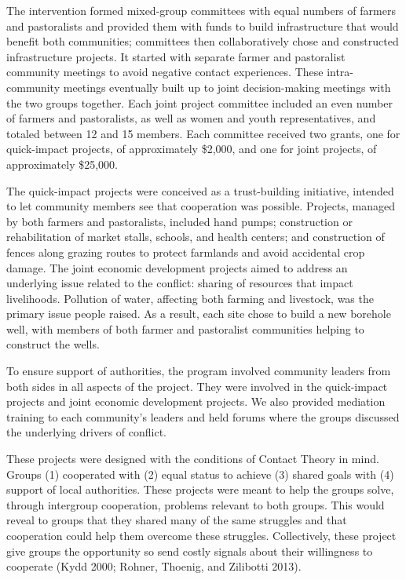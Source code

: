 \documentclass[11pt]{article}
\begin{document}
The intervention formed mixed-group committees with equal numbers of
farmers and pastoralists and provided them with funds to build
infrastructure that would benefit both communities; committees then
collaboratively chose and constructed infrastructure projects. It
started with separate farmer and pastoralist community meetings to avoid
negative contact experiences. These intra-community meetings eventually
built up to joint decision-making meetings with the two groups together.
Each joint project committee included an even number of farmers and
pastoralists, as well as women and youth representatives, and totaled
between 12 and 15 members. Each committee received two grants, one for
quick-impact projects, of approximately \$2,000, and one for joint
projects, of approximately \$25,000.

The quick-impact projects were conceived as a trust-building initiative,
intended to let community members see that cooperation was possible.
Projects, managed by both farmers and pastoralists, included hand pumps;
construction or rehabilitation of market stalls, schools, and health
centers; and construction of fences along grazing routes to protect
farmlands and avoid accidental crop damage. The joint economic
development projects aimed to address an underlying issue related to the
conflict: sharing of resources that impact livelihoods. Pollution of
water, affecting both farming and livestock, was the primary issue
people raised. As a result, each site chose to build a new borehole
well, with members of both farmer and pastoralist communities helping to
construct the wells.

To ensure support of authorities, the program involved community leaders
from both sides in all aspects of the project. They were involved in the
quick-impact projects and joint economic development projects. We also
provided mediation training to each community's leaders and held forums
where the groups discussed the underlying drivers of conflict.

These projects were designed with the conditions of Contact Theory in
mind. Groups (1) cooperated with (2) equal status to achieve (3) shared
goals with (4) support of local authorities. These projects were meant
to help the groups solve, through intergroup cooperation, problems
relevant to both groups. This would reveal to groups that they shared
many of the same struggles and that cooperation could help them overcome
these struggles. Collectively, these project give groups the opportunity
so send costly signals about their willingness to cooperate (Kydd 2000;
Rohner, Thoenig, and Zilibotti 2013).
\end{document}
